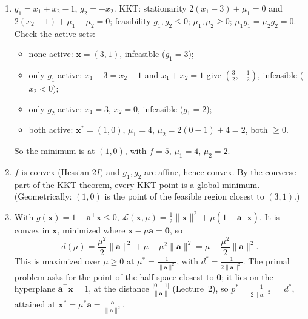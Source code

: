 \documentclass[11pt]{article}
\newcommand{\norm}[1]{\lVert #1 \rVert}
\begin{document}
\begin{enumerate}[label=(\alph*)]
    \item $g_1 = x_1 + x_2 - 1$, $g_2 = -x_2$. KKT: stationarity $2(x_1 - 3) + \mu_1 = 0$ and $2(x_2 - 1) + \mu_1 - \mu_2 = 0$; feasibility $g_1, g_2 \leq 0$; $\mu_1, \mu_2 \geq 0$; $\mu_1g_1 = \mu_2g_2 = 0$. Check the active sets:
    \begin{itemize}
        \item none active: $\mathbf{x} = (3, 1)$, infeasible ($g_1 = 3$);
        \item only $g_1$ active: $x_1 - 3 = x_2 - 1$ and $x_1 + x_2 = 1$ give $(\frac{3}{2}, -\frac{1}{2})$, infeasible ($x_2 < 0$);
        \item only $g_2$ active: $x_1 = 3$, $x_2 = 0$, infeasible ($g_1 = 2$);
        \item both active: $\mathbf{x}^* = (1, 0)$, $\mu_1 = 4$, $\mu_2 = 2(0 - 1) + 4 = 2$, both $\geq 0$.
    \end{itemize}
    So the minimum is at $(1, 0)$, with $f = 5$, $\mu_1 = 4$, $\mu_2 = 2$.
    \item $f$ is convex (Hessian $2I$) and $g_1, g_2$ are affine, hence convex. By the converse part of the KKT theorem, every KKT point is a global minimum. (Geometrically: $(1, 0)$ is the point of the feasible region closest to $(3, 1)$.)
    \item With $g(\mathbf{x}) = 1 - \mathbf{a}^\top\mathbf{x} \leq 0$, $\mathcal{L}(\mathbf{x}, \mu) = \frac{1}{2}\norm{\mathbf{x}}^2 + \mu(1 - \mathbf{a}^\top\mathbf{x})$. It is convex in $\mathbf{x}$, minimized where $\mathbf{x} - \mu\mathbf{a} = \mathbf{0}$, so
    \[d(\mu) = \frac{\mu^2}{2}\norm{\mathbf{a}}^2 + \mu - \mu^2\norm{\mathbf{a}}^2 = \mu - \frac{\mu^2}{2}\norm{\mathbf{a}}^2.\]
    This is maximized over $\mu \geq 0$ at $\mu^* = \frac{1}{\norm{\mathbf{a}}^2}$, with $d^* = \frac{1}{2\norm{\mathbf{a}}^2}$. The primal problem asks for the point of the half-space closest to $\mathbf{0}$; it lies on the hyperplane $\mathbf{a}^\top\mathbf{x} = 1$, at the distance $\frac{|0 - 1|}{\norm{\mathbf{a}}}$ (Lecture~2), so $p^* = \frac{1}{2\norm{\mathbf{a}}^2} = d^*$, attained at $\mathbf{x}^* = \mu^*\mathbf{a} = \frac{\mathbf{a}}{\norm{\mathbf{a}}^2}$.
\end{enumerate}
\end{document}
